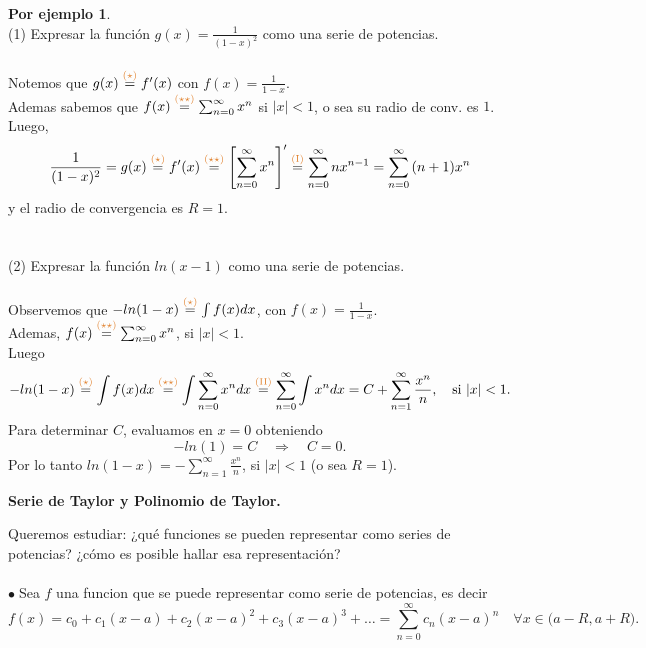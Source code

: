 \documentclass{article}
\theoremstyle{definition}
\newtheorem*{ej}{Por ejemplo}
\theoremstyle{remark}
\newcommand\bl{$\bullet\;$}
\begin{document}
\begin{ej} \; \\
 (1) \quad  Expresar la función $g(x)=\frac{1}{(1-x)^2}$ como una serie de potencias. \\ \\
  Notemos que $g(x)\overset{\textcolor{rojop2}{(\star)}}{=}f'(x)$ con $f(x)=\frac{1}{1-x}.$ \\ 
  Ademas sabemos que $f(x)\overset{\textcolor{rojop2}{(\star\star)}}{=}\sum_{n=0}^{\infty}{x^n}$ si $|x|<1$, o sea su radio de conv. es $1$. \\ 
  Luego, \[\frac{1}{(1-x)^2}=g(x)\overset{\textcolor{rojop2}{(\star)}}{=}f'(x)\overset{\textcolor{rojop2}{(\star\star)}}{=}\left[\sum_{n=0}^{\infty}{x^n}\right]'\overset{\textcolor{rojop2}{\text{(I)}}}{=}\sum_{n=0}^{\infty}{nx^{n-1}}=\sum_{n=0}^{\infty}{(n+1)x^n}\] y el radio de convergencia es $R=1$. \\ \\ \\
  (2) Expresar la función $ln(x-1)$ como una serie de potencias. \\ \\ 
  Observemos que  $-ln(1-x)\overset{\textcolor{rojop2}{(\star)}}{=}\int{f(x)dx}$, con $f(x)=\frac{1}{1-x}$. \\
  Ademas, $f(x)\overset{\textcolor{rojop2}{(\star\star)}}{=}\sum_{n=0}^{\infty}{x^n}$, si $|x|<1$. \\
  Luego \[
-ln(1-x)\overset{\textcolor{rojop2}{(\star)}}{=}\int{f(x)dx}\overset{\textcolor{rojop2}{(\star\star)}}{=}\int{\sum_{n=0}^{\infty}{x^n}dx}\overset{\textcolor{rojop2}{\text{(II)}}}{=}\sum_{n=0}^{\infty}{\int{x^ndx}}=C+\sum_{n=1}^{\infty}{\frac{x^n}{n}}, \quad \text{si } |x|<1.
  \]
  Para determinar $C$, evaluamos en $x=0$ obteniendo \[
-ln(1)=C \quad \Rightarrow \quad C=0.
  \]
  Por lo tanto \quad $ln(1-x)=-\sum_{n=1}^{\infty}{\frac{x^n}{n}}$, si $|x|<1$ \quad \big(o sea $R=1$\big).
\end{ej} 
\pagebreak
\begin{center}
  \textbf{Serie de Taylor y Polinomio de Taylor.}
\end{center}
Queremos estudiar: ¿qué funciones se pueden representar como series de potencias? ¿cómo es posible hallar esa representación? \\\\

\bl Sea $f$ una funcion que se puede representar como serie de potencias, es decir \[ 
  f(x)=c_0+c_1(x-a)+c_2(x-a)^2+c_3(x-a)^3+\dots = \sum_{n=0}^{\infty}{c_n(x-a)^n} \quad \forall x \in \big(a-R,a+R\big).
\]
\end{document}
